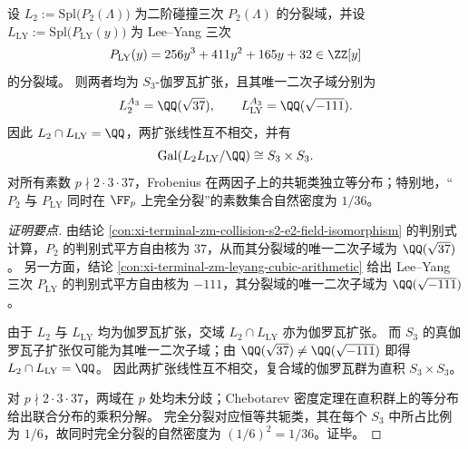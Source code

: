 \begin{conclusion}\label{con:xi-terminal-zm-collision-s2-leyang-linear-disjointness}
设 \(L_{2}:=\mathrm{Spl}\bigl(P_2(\Lambda)\bigr)\) 为二阶碰撞三次 \(P_2(\Lambda)\) 的分裂域，并设 \(L_{\mathrm{LY}}:=\mathrm{Spl}\bigl(P_{\mathrm{LY}}(y)\bigr)\) 为 Lee--Yang 三次
\[
P_{\mathrm{LY}}(y)=256y^{3}+411y^{2}+165y+32\in\ZZ[y]
\]
的分裂域。
则两者均为 \(S_3\)-伽罗瓦扩张，且其唯一二次子域分别为
\[
L_2^{A_3}=\QQ(\sqrt{37}),\qquad L_{\mathrm{LY}}^{A_3}=\QQ(\sqrt{-111}).
\]
因此 \(L_2\cap L_{\mathrm{LY}}=\QQ\)，两扩张线性互不相交，并有
\[
\mathrm{Gal}(L_2L_{\mathrm{LY}}/\QQ)\cong S_3\times S_3.
\]
对所有素数 \(p\nmid 2\cdot 3\cdot 37\)，Frobenius 在两因子上的共轭类独立等分布；特别地，“\(P_2\) 与 \(P_{\mathrm{LY}}\) 同时在 \(\FF_p\) 上完全分裂”的素数集合自然密度为 \(1/36\)。
\end{conclusion}
\begin{proof}[证明要点]
由结论 \ref{con:xi-terminal-zm-collision-s2-e2-field-isomorphism} 的判别式计算，\(P_2\) 的判别式平方自由核为 \(37\)，从而其分裂域的唯一二次子域为 \(\QQ(\sqrt{37})\)。
另一方面，结论 \ref{con:xi-terminal-zm-leyang-cubic-arithmetic} 给出 Lee--Yang 三次 \(P_{\mathrm{LY}}\) 的判别式平方自由核为 \(-111\)，其分裂域的唯一二次子域为 \(\QQ(\sqrt{-111})\)。
\par
由于 \(L_2\) 与 \(L_{\mathrm{LY}}\) 均为伽罗瓦扩张，交域 \(L_2\cap L_{\mathrm{LY}}\) 亦为伽罗瓦扩张。
而 \(S_3\) 的真伽罗瓦子扩张仅可能为其唯一二次子域；由 \(\QQ(\sqrt{37})\neq\QQ(\sqrt{-111})\) 即得 \(L_2\cap L_{\mathrm{LY}}=\QQ\)。
因此两扩张线性互不相交，复合域的伽罗瓦群为直积 \(S_3\times S_3\)。
\par
对 \(p\nmid 2\cdot 3\cdot 37\)，两域在 \(p\) 处均未分歧；Chebotarev 密度定理在直积群上的等分布给出联合分布的乘积分解。
完全分裂对应恒等共轭类，其在每个 \(S_3\) 中所占比例为 \(1/6\)，故同时完全分裂的自然密度为 \((1/6)^2=1/36\)。证毕。
\end{proof}

